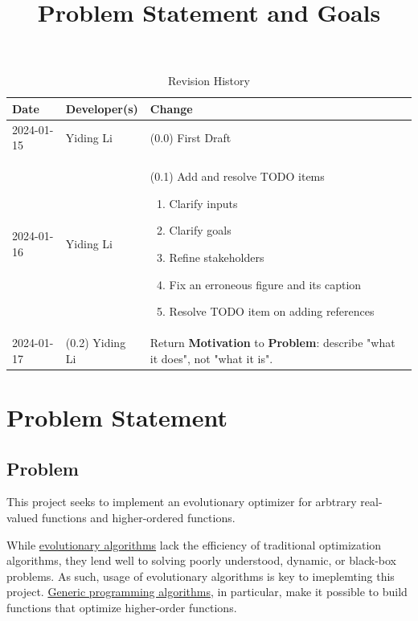 \documentclass{article}
\title{Problem Statement and Goals\\\progname}
\author{\authname}
\date{}
\begin{document}
\maketitle

\begin{table}[hp]
\caption{Revision History} \label{TblRevisionHistory}
\begin{tabularx}{\textwidth}{llX}
\toprule
\textbf{Date} & \textbf{Developer(s)} & \textbf{Change}\\
\midrule
2024-01-15 & Yiding Li & (0.0) First Draft\\
2024-01-16 & Yiding Li & (0.1) Add and resolve TODO items
\begin{enumerate}
    \item Clarify inputs
    \item Clarify goals
    \item Refine stakeholders
    \item Fix an erroneous figure and its caption
    \item Resolve TODO item on adding references
\end{enumerate}
\\
2024-01-17 & (0.2) Yiding Li & Return \textbf{Motivation} to \textbf{Problem}: describe "what it does", not "what it is".\\
\bottomrule
\end{tabularx}
\end{table}

\section{Problem Statement}


\subsection{Problem}

This project seeks to implement an evolutionary optimizer for arbtrary real-valued functions and higher-ordered functions.

While \hyperref[sec:evalg]{evolutionary algorithms} lack the efficiency of traditional optimization algorithms, they lend well to solving poorly understood, dynamic, or black-box problems. As such, usage of evolutionary algorithms is key to imeplemting this project. \hyperref[sec:genalg]{Generic programming algorithms}, in particular, make it possible to build functions that optimize higher-order functions.
\end{document}
